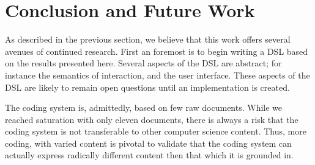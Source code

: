 \documentclass[sigconf]{acmart}
\begin{document}
\section{Conclusion and Future Work}

As described in the previous section, we believe that this work offers several
avenues of continued research. First an foremost is to begin writing a DSL based
on the results presented here. Several aspects of the DSL are abstract; for
instance the semantics of interaction, and the user interface. These aspects of
the DSL are likely to remain open questions until an implementation is created. 

The coding system is, admittedly, based on few raw documents. While we reached
saturation with only eleven documents, there is always a risk that the coding
system is not transferable to other computer science content. Thus, more coding,
with varied content is pivotal to validate that the coding system can actually
express radically different content then that which it is grounded in.



\end{document}
